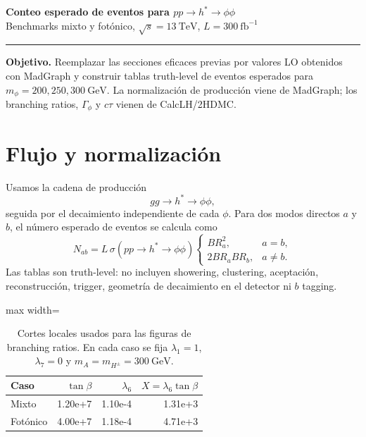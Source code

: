 \documentclass[10pt]{article}
\begin{document}
\begin{center}
{\LARGE\bfseries Conteo esperado de eventos para $pp\to h^*\to\phi\phi$}\\[0.25em]
{\large Benchmarks mixto y fotónico, $\sqrt{s}=13~\mathrm{TeV}$, $L=300~\mathrm{fb}^{-1}$}\\[0.35em]
\rule{0.92\textwidth}{0.4pt}
\end{center}

\textbf{Objetivo.} Reemplazar las secciones eficaces previas por valores LO obtenidos con MadGraph y construir tablas truth-level de eventos esperados para $m_\phi=200,250,300~\mathrm{GeV}$. La normalización de producción viene de MadGraph; los branching ratios, $\Gamma_\phi$ y $c\tau$ vienen de CalcLH/2HDMC.

\section{Flujo y normalización}

Usamos la cadena de producción
\begin{equation}
    gg\to h^*\to\phi\phi,
\end{equation}
seguida por el decaimiento independiente de cada $\phi$. Para dos modos directos $a$ y $b$, el número esperado de eventos se calcula como
\begin{equation}
N_{ab}=L\,\sigma(pp\to h^*\to\phi\phi)
\begin{cases}
BR_a^2, & a=b,\\
2BR_aBR_b, & a\neq b.
\end{cases}
\label{eq:eventos}
\end{equation}
Las tablas son truth-level: no incluyen showering, clustering, aceptación, reconstrucción, trigger, geometría de decaimiento en el detector ni $b$ tagging.

\begin{table}[H]
\centering
\small
\caption{Cortes locales usados para las figuras de branching ratios. En cada caso se fija $\lambda_1=1$, $\lambda_7=0$ y $m_A=m_{H^\pm}=300~\mathrm{GeV}$.}
\label{tab:bench}
\begin{adjustbox}{max width=\textwidth}
\begin{tabular}{lrrr}
\toprule
Caso & $\tan\beta$ & $\lambda_6$ & $X=\lambda_6\tan\beta$ \\
\midrule
Mixto & 1.20e+7 & 1.10e-4 & 1.31e+3 \\
Fotónico & 4.00e+7 & 1.18e-4 & 4.71e+3 \\
\bottomrule
\end{tabular}
\end{adjustbox}
\end{table}
\end{document}
